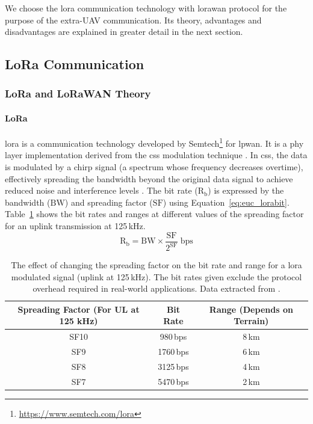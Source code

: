 We choose the \gls{lora} communication technology with \gls{lorawan} protocol for the purpose of the extra-\gls{UAV} communication. Its theory, advantages and disadvantages are explained in greater detail in the next section. 

\subsection{LoRa Communication}
\label{sec:euc_lora}

\subsubsection{LoRa and LoRaWAN Theory}

\paragraph{LoRa} \gls{lora} is a communication technology developed by Semtech\footnote{\url{https://www.semtech.com/lora}} for \gls{lpwan}. It is a \gls{phy} layer implementation derived from the \gls{css} modulation technique \cite{semtech2024lora}. In \gls{css}, the data is modulated by a chirp signal (a spectrum whose frequency decreases overtime), effectively spreading the bandwidth beyond the original data signal to achieve reduced noise and interference levels \cite{devalal2018lora}. The bit rate ($\mathrm{R_b}$) is expressed by the bandwidth ($\mathrm{BW}$) and spreading factor ($\mathrm{SF}$) using Equation~\ref{eq:euc_lorabit}. Table~\ref{tab:euc_lorasf} shows the bit rates and ranges at different values of the spreading factor for an uplink transmission at 125\,kHz. 
\begin{equation} 
\label{eq:euc_lorabit}
\mathrm{R_b} = \mathrm{BW} \times \frac{\mathrm{SF}}{2^{\mathrm{SF}}} \; \mathrm{bps}
\end{equation}

\begin{table}[h!]
    \centering
    \begin{tabular}{|c|c|c|}
    \hline
        \textbf{Spreading Factor} (For UL at 125 kHz) & \textbf{Bit Rate} & \textbf{Range} (Depends on Terrain) \\
    \hline\hline
        SF10 & 980\,bps & 8\,km \\
    \hline
        SF9 & 1760\,bps & 6\,km \\
    \hline
        SF8 & 3125\,bps & 4\,km \\
    \hline
        SF7 & 5470\,bps & 2\,km \\
    \hline
    \end{tabular}
    \caption[LoRa Spreading Factors' Effect on Bit Rate and Range]{The effect of changing the spreading factor on the bit rate and range for a \gls{lora} modulated signal (uplink at 125\,kHz). The bit rates given exclude the protocol overhead required in real-world applications. Data extracted from \cite{semtech2024lora}.}
    \label{tab:euc_lorasf}
\end{table}

